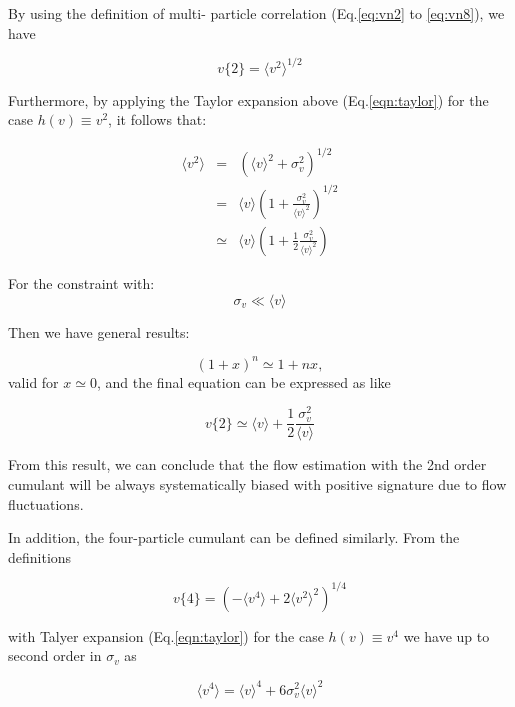 By using the definition of multi- particle correlation (Eq.\ref{eq:vn2} to \ref{eq:vn8}), we have 

\begin{equation}
	v\{2\} = \langle v^2 \rangle ^{1/2}
\end{equation}

Furthermore, by applying the Taylor expansion above (Eq.\ref{eqn:taylor}) for the case $h(v) \equiv v^2$, it follows that:

\begin{eqnarray}
		\langle v^2 \rangle &=& (\langle v \rangle^2 + \sigma_v^2)^{1/2} \\
		&=& \langle v \rangle \left( 1+\frac{\sigma_v^2}{\langle v \rangle^2} \right)^{1/2} \\ 
		&\simeq & \langle v \rangle \left( 1+\frac{1}{2} \frac{\sigma_v^2}{\langle v \rangle^2} \right) 
\end{eqnarray}

For the constraint with:
\begin{equation}
	\sigma_v \ll \langle v \rangle
\end{equation}

Then we have general results:

\begin{equation}
	(1+x)^n \simeq 1 + nx,
\end{equation}
valid for $x \simeq 0$, and the final equation can be expressed as like

\begin{equation}
	v\{2\} \simeq \langle v \rangle + \frac{1}{2} \frac{\sigma_v^2}{\langle v \rangle}
	\label{eq:2p-cumulant}
\end{equation}

From this result, we can conclude that the flow estimation with the 2nd order cumulant will be always systematically biased with positive signature due to flow fluctuations.

In addition, the four-particle cumulant can be defined similarly. From the definitions

\begin{equation}
	v\{4\} = ( -\langle v^4 \rangle + 2\langle v^2 \rangle ^2 )^{1/4}
\end{equation}

with Talyer expansion (Eq.\ref{eqn:taylor}) for the case $h(v) \equiv v^4$ we have up to second order in $\sigma_v$ as

\begin{equation}
	\langle v^4 \rangle = \langle v \rangle^4 + 6\sigma_v^2\langle v \rangle ^2 
\end{equation}

